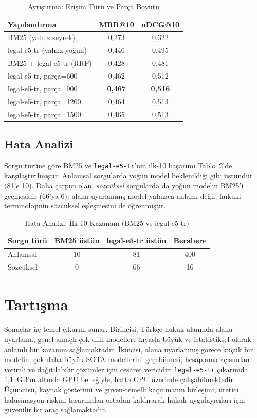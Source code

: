 \documentclass[conference]{IEEEtran}
\begin{document}
\begin{table}[t]
\caption{Ayrıştırma: Erişim Türü ve Parça Boyutu}
\label{tab:ablation}
\centering
\begin{tabular}{lcc}
\toprule
Yapılandırma & MRR@10 & nDCG@10 \\
\midrule
BM25 (yalnız seyrek) & 0,273 & 0,322 \\
legal-e5-tr (yalnız yoğun) & 0,446 & 0,495 \\
BM25 + legal-e5-tr (RRF) & 0,428 & 0,481 \\
\midrule
legal-e5-tr, parça=600 & 0,462 & 0,512 \\
legal-e5-tr, parça=900 & \textbf{0,467} & \textbf{0,516} \\
legal-e5-tr, parça=1200 & 0,464 & 0,513 \\
legal-e5-tr, parça=1500 & 0,465 & 0,513 \\
\bottomrule
\end{tabular}
\end{table}

\subsection{Hata Analizi}
Sorgu türüne göre BM25 ve \texttt{legal-e5-tr}'nin ilk-10 başarımı Tablo~\ref{tab:error}'de karşılaştırılmıştır. Anlamsal sorgularda yoğun model beklenildiği gibi üstündür (81'e 10). Daha çarpıcı olan, \emph{sözcüksel} sorgularda da yoğun modelin BM25'i geçmesidir (66'ya 0): alana uyarlanmış model yalnızca anlamı değil, hukuki terminolojinin sözcüksel eşleşmesini de öğrenmiştir.

\begin{table}[t]
\caption{Hata Analizi: İlk-10 Kazananı (BM25 vs legal-e5-tr)}
\label{tab:error}
\centering
\begin{tabular}{lccc}
\toprule
Sorgu türü & BM25 üstün & legal-e5-tr üstün & Berabere \\
\midrule
Anlamsal & 10 & 81 & 400 \\
Sözcüksel & 0 & 66 & 16 \\
\bottomrule
\end{tabular}
\end{table}

\section{Tartışma}
Sonuçlar üç temel çıkarım sunar. Birincisi, Türkçe hukuk alanında alana uyarlama, genel amaçlı çok dilli modellere kıyasla büyük ve istatistiksel olarak anlamlı bir kazanım sağlamaktadır. İkincisi, alana uyarlanmış görece küçük bir modelin, çok daha büyük SOTA modellerini geçebilmesi, hesaplama açısından verimli ve dağıtılabilir çözümler için cesaret vericidir; \texttt{legal-e5-tr} çıkarımda 1,1~GB'ın altında GPU belleğiyle, hatta CPU üzerinde çalışabilmektedir. Üçüncüsü, kaynak gösterimi ve güven-temelli kaçınmanın birleşimi, üretici halüsinasyon riskini tasarımdan ortadan kaldırarak hukuk uygulayıcıları için güvenilir bir araç sağlamaktadır.
\end{document}
